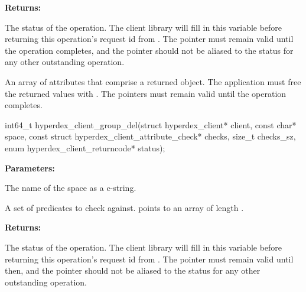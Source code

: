 \noindent\textbf{Returns:}
\begin{description}[labelindent=\widthof{{\code{attrs}, \code{attrs\_sz}}},leftmargin=*,noitemsep,nolistsep,align=right]
\item[\code{status}] The status of the operation.  The client library will fill in this variable before returning this operation's request id from .  The pointer must remain valid until the operation completes, and the pointer should not be aliased to the status for any other outstanding operation.
\item[\code{attrs}, \code{attrs\_sz}] An array of attributes that comprise a returned object.  The application must free the returned values with .  The pointers must remain valid until the operation completes.
\end{description}

\funcsep
{}
\begin{ccode}
int64_t hyperdex_client_group_del(struct hyperdex_client* client,
                const char* space,
                const struct hyperdex_client_attribute_check* checks, size_t checks_sz,
                enum hyperdex_client_returncode* status);
\end{ccode}
\funcdesc 

\noindent\textbf{Parameters:}
\begin{description}[labelindent=\widthof{{\code{checks}, \code{checks\_sz}}},leftmargin=*,noitemsep,nolistsep,align=right]
\item[\code{space}] The name of the space as a c-string.
\item[\code{checks}, \code{checks\_sz}] A set of predicates to check against.   points to an array of length .
\end{description}

\noindent\textbf{Returns:}
\begin{description}[labelindent=\widthof{{\code{status}}},leftmargin=*,noitemsep,nolistsep,align=right]
\item[\code{status}] The status of the operation.  The client library will fill in this variable before returning this operation's request id from .  The pointer must remain valid until then, and the pointer should not be aliased to the status for any other outstanding operation.
\end{description}


